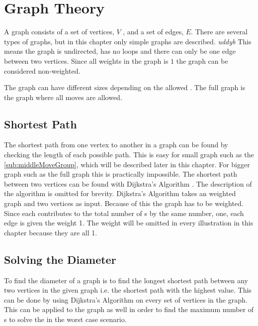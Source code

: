 \chapter {Graph Theory}
\label{chap:graphTheory}

A graph consists of a set of vertices, $V$ \cite[p. 592]{Rosen07}, and a set of edges, $E$. There are several types of graphs, but in this chapter only simple graphs are described. \textit{uddyb}
This means the graph is undirected, has no loops and there can only be one edge between two vertices. 
Since all weights in the \rubik{} graph is $1$ the graph can be considered non-weighted. 

The \rubik{} graph can have different sizes depending on the allowed \twist{}. The full \rubik{} graph is the graph where all moves are allowed. 


\section{Shortest Path}
The shortest path from one vertex to another in a graph can be found by checking the length of each possible path. 
This is easy for small graph such as the  \ref{sub:middleMoveGroup}, which will be described later in this chapter. For bigger graph such as the full \rubik{} graph this is practically impossible. 
The shortest path between two vertices can be found with Dijkstra's Algorithm \cite[p. 651]{Rosen07}. The description of the algorithm is omitted for brevity. Dijkstra's Algorithm takes an weighted graph and two vertices as input. 
Because of this the \rubik{} graph has to be weighted. Since each \twist{} contributes to the total number of \twist{}s by the same number, one, each edge is given the weight 1. The weight will be omitted in every illustration in this chapter because they are all 1.  

\section{Solving the Diameter}
To find the diameter of a graph is to find the longest shortest path between any two vertices in the given graph i.e. the shortest path with the highest value. 
This can be done by using Dijkstra's Algorithm on every set of vertices in the graph. 
This can be applied to the \rubik{} graph as well in order to find the maximum number of \twist{}s to solve the \rubik{} in the worst case scenario. %

